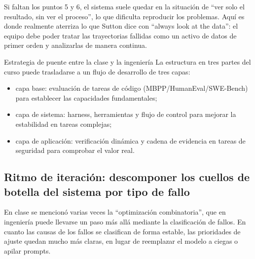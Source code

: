 \documentclass[a4paper]{article}
\begin{document}
Si faltan los puntos 5 y 6, el sistema suele quedar en la situación de ``ver solo el resultado, sin ver el proceso'', lo que dificulta reproducir los problemas. Aquí es donde realmente aterriza lo que Sutton dice con ``always look at the data'': el equipo debe poder tratar las trayectorias fallidas como un activo de datos de primer orden y analizarlas de manera continua.

\begin{knowledgebox}{Estrategia de puente entre la clase y la ingeniería}
La estructura en tres partes del curso puede trasladarse a un flujo de desarrollo de tres capas:
\begin{itemize}
    \item capa base: evaluación de tareas de código (MBPP/HumanEval/SWE-Bench) para establecer las capacidades fundamentales;
    \item capa de sistema: harness, herramientas y flujo de control para mejorar la estabilidad en tareas complejas;
    \item capa de aplicación: verificación dinámica y cadena de evidencia en tareas de seguridad para comprobar el valor real.
\end{itemize}
\end{knowledgebox}

\subsection{Ritmo de iteración: descomponer los cuellos de botella del sistema por tipo de fallo}
En clase se mencionó varias veces la ``optimización combinatoria'', que en ingeniería puede llevarse un paso más allá mediante la clasificación de fallos. En cuanto las causas de los fallos se clasifican de forma estable, las prioridades de ajuste quedan mucho más claras, en lugar de reemplazar el modelo a ciegas o apilar prompts.
\end{document}
